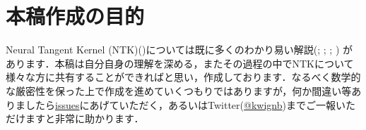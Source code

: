 \section{本稿作成の目的}
Neural Tangent Kernel (NTK)(\citealp{jacot2018neural})については既に多くのわかり易い解説(\citealp{rajat2019ntk}; \citealp{甘利俊一2019情報幾何学の新展開}; \citealp{TaijiSuzuki2019theory}; \citealp{Osaka2020ntk}) があります．本稿は自分自身の理解を深める，またその過程の中でNTKについて様々な方に共有することができればと思い，作成しております．なるべく数学的な厳密性を保った上で作成を進めていくつもりではありますが，何か間違い等ありましたら\href{https://github.com/kwignb/Neural-Tangent-Kernel/issues}{issues}にあげていただく，あるいはTwitter(\href{https://twitter.com/sysc_kt}{@kwignb})までご一報いただけますと非常に助かります．